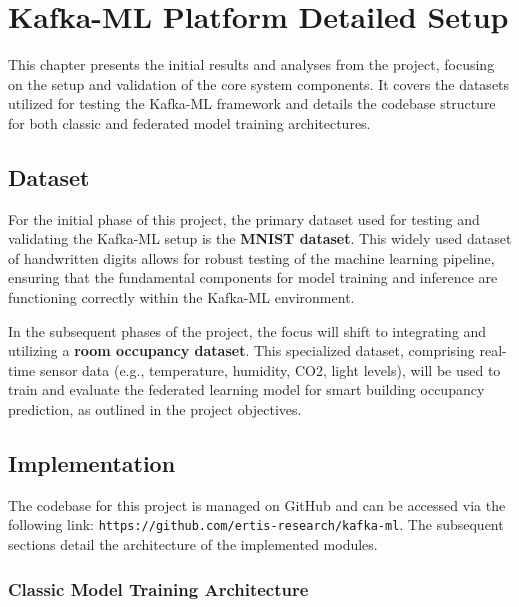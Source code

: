 \chapter{Kafka-ML Platform Detailed Setup}

\label{chap:kafkaml_setup}

This chapter presents the initial results and analyses from the project, focusing on the setup and validation of the core system components. It covers the datasets utilized for testing the Kafka-ML framework and details the codebase structure for both classic and federated model training architectures.



\section{Dataset}
\label{sec:dataset}

For the initial phase of this project, the primary dataset used for testing and validating the Kafka-ML setup is the \textbf{MNIST dataset}. This widely used dataset of handwritten digits allows for robust testing of the machine learning pipeline, ensuring that the fundamental components for model training and inference are functioning correctly within the Kafka-ML environment.

In the subsequent phases of the project, the focus will shift to integrating and utilizing a \textbf{room occupancy dataset}. This specialized dataset, comprising real-time sensor data (e.g., temperature, humidity, CO2, light levels), will be used to train and evaluate the federated learning model for smart building occupancy prediction, as outlined in the project objectives.



\section{Implementation}
\label{sec:code}

The codebase for this project is managed on GitHub and can be accessed via the following link: \texttt{https://github.com/ertis-research/kafka-ml}. The subsequent sections detail the architecture of the implemented modules.

\subsection{Classic Model Training Architecture}
\label{subsec:classic_model_training}

